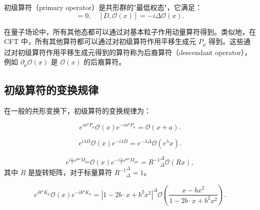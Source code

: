 \begin{definition}[初级算符]
初级算符（primary operator）是共形群的"最低权态"，它满足：
\begin{equation}
    [K_\mu, \mathcal{O}(x)] = 0, \quad [D, \mathcal{O}(x)] = -i\Delta \mathcal{O}(x).
\end{equation}
\end{definition}

\begin{note}[物理动机]
在量子场论中，所有其他态都可以通过对基本粒子作用动量算符得到。类似地，在 CFT 中，所有其他算符都可以通过对初级算符作用平移生成元 $P_\mu$ 得到。这些通过对初级算符作用平移生成元得到的算符称为后裔算符（descendant operator），例如 $\partial_\mu \mathcal{O}(x)$ 是 $\mathcal{O}(x)$ 的后裔算符。
\end{note}

\subsection{初级算符的变换规律}

在一般的共形变换下，初级算符的变换规律为：

\begin{property}[平移变换]
\begin{equation}
    e^{ia^\mu P_\mu} \mathcal{O}(x) e^{-ia^\mu P_\mu} = \mathcal{O}(x+a).
\end{equation}
\end{property}

\begin{property}[标度变换]
\begin{equation}
    e^{i\lambda D} \mathcal{O}(x) e^{-i\lambda D} = e^{-\lambda \Delta} \mathcal{O}(e^\lambda x).
\end{equation}
\end{property}

\begin{property}[旋转变换]
\begin{equation}
    e^{i\frac{1}{2}\omega^{\mu\nu}M_{\mu\nu}} \mathcal{O}(x) e^{-i\frac{1}{2}\omega^{\mu\nu}M_{\mu\nu}} = {R^{-1}}^\Delta_\Delta \mathcal{O}(R x),
\end{equation}
其中 $R$ 是旋转矩阵，对于标量算符 ${R^{-1}}^\Delta_\Delta = 1$。
\end{property}

\begin{property}[特殊共形变换]
\begin{equation}
    e^{ib^\mu K_\mu} \mathcal{O}(x) e^{-ib^\mu K_\mu} = |1 - 2b \cdot x + b^2 x^2|^\Delta \mathcal{O}\left(\frac{x - b x^2}{1 - 2b \cdot x + b^2 x^2}\right).
\end{equation}
\end{property}

